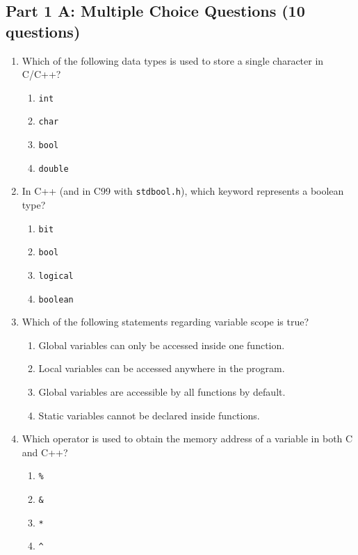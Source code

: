 \documentclass[a4paper,12pt]{article}
\begin{document}
\subsection*{Part 1 A: Multiple Choice Questions (10 questions)}
\begin{enumerate}
    \item Which of the following data types is used to store a single character in C/C++?
    \begin{enumerate}
        \item \texttt{int}
        \item \texttt{char}
        \item \texttt{bool}
        \item \texttt{double}
    \end{enumerate}

    \item In C++ (and in C99 with \texttt{stdbool.h}), which keyword represents a boolean type?
    \begin{enumerate}
        \item \texttt{bit}
        \item \texttt{bool}
        \item \texttt{logical}
        \item \texttt{boolean}
    \end{enumerate}

    \item Which of the following statements regarding variable scope is true?
    \begin{enumerate}
        \item Global variables can only be accessed inside one function.
        \item Local variables can be accessed anywhere in the program.
        \item Global variables are accessible by all functions by default.
        \item Static variables cannot be declared inside functions.
    \end{enumerate}

    \item Which operator is used to obtain the memory address of a variable in both C and C++?
    \begin{enumerate}
        \item \texttt{\%}
        \item \texttt{\&}
        \item \texttt{*}
        \item \texttt{\^{}}
    \end{enumerate}


\end{enumerate}
\end{document}
